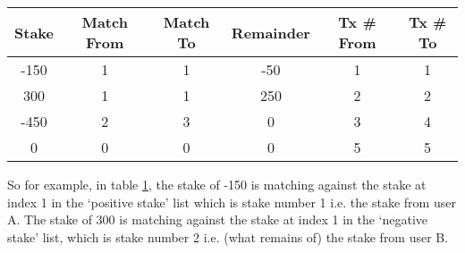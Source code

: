 \begin{table}[ht]
\centering
\caption{}
\label{appa:modifiedexamplelog}
\begin{tabular}{|c|c|c|c|c|c|}
\hline
Stake & Match From & Match To & Remainder & Tx \# From & Tx \# To\\ \hline
-150  & 1          & 1        & -50      & 1 & 1 \\ \hline
300   & 1          & 1        & 250      & 2 & 2 \\ \hline
-450  & 2          & 3        & 0       &  3 & 4 \\ \hline
0  & 0         & 0        & 0 & 5 & 5            \\ \hline
\end{tabular}

\end{table}

So for example, in table \ref{appa:modifiedexamplelog}, the stake of -150 is matching against the stake at index 1 in the `positive stake' list which is stake number 1 i.e. the stake from user A. The stake of 300 is matching against the stake at index 1 in the `negative stake' list, which is stake number 2 i.e. (what remains of) the stake from user B.